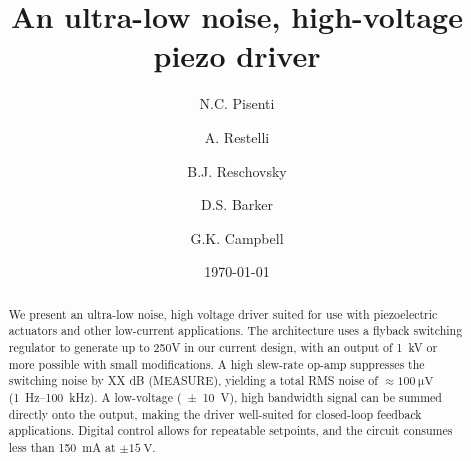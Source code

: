 \documentclass[aip,rsi,reprint]{revtex4-1} %
\begin{document}

\title{An ultra-low noise, high-voltage piezo driver}



\author{N.C. Pisenti}
\author{A. Restelli}
\author{B.J. Reschovsky}
\author{D.S. Barker}
\author{G.K. Campbell}


\date{\today}

\begin{abstract}
We present an ultra-low noise, high voltage driver suited for use with piezoelectric actuators and other low-current applications. 
The architecture uses a flyback switching regulator to generate up to 250V in our current design, with an output of \SI{1}{\kilo\volt} or more possible with small modifications. 
A high slew-rate op-amp suppresses the switching noise by XX dB (MEASURE), yielding a total RMS noise of $\approx\SI{100}{\micro\volt}$ (\SI{1}{\hertz}--\SI{100}{\kilo\hertz}).
A low-voltage (\SI{\pm 10}{\volt}), high bandwidth signal can be summed directly onto the output, making the driver well-suited for closed-loop feedback applications.
Digital control allows for repeatable setpoints, and the circuit consumes less than \SI{150}{\milli\ampere} at $\pm\SI{15}{\volt}$.
\end{abstract}

\pacs{}%

\maketitle %
\end{document}
